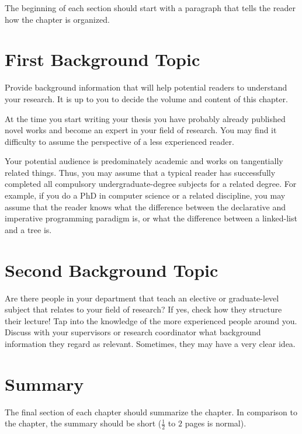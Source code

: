 
\noindent The beginning of each section should start with a paragraph that tells the reader how the chapter is organized.

\section{First Background Topic}
\label{s:First-Background-Topic}

Provide background information that will help potential readers to understand your research. It is up to you to decide the volume and content of this chapter.

At the time you start writing your thesis you have probably already published novel works and become an expert in your field of research. You may find it difficulty to assume the perspective of a less experienced reader.

Your potential audience is predominately academic and works on tangentially related things. Thus, you may assume that a typical reader has successfully completed all compulsory undergraduate-degree subjects for a related degree. For example, if you do a PhD in computer science or a related discipline, you may assume that the reader knows what the difference between the declarative and imperative programming paradigm is, or what the difference between a linked-list and a tree is.

\section{Second Background Topic}
\label{s:Second-Background-Topic}

Are there people in your department that teach an elective or graduate-level subject that relates to your field of research? If yes, check how they structure their lecture! Tap into the knowledge of the more experienced people around you. Discuss with your supervisors or research coordinator what background information they regard as relevant. Sometimes, they may have a very clear idea.

\section{Summary}
\label{s:Background-Summary}

The final section of each chapter should summarize the chapter. In comparison to the chapter, the summary should be short ($\frac{1}{2}$ to $2$ pages is normal).
